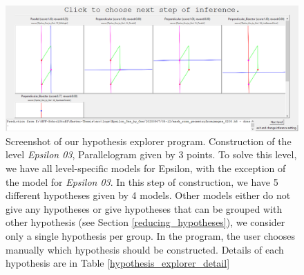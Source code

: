 \begin{figure}[h!]
\centering
\includegraphics[width=140mm]{img/hypothesis_explorer/explorer.png}
\caption{Screenshot of our hypothesis explorer program. Construction of the level \textit{Epsilon 03}, Parallelogram given by 3 points. To solve this level, we have all level-specific models for Epsilon, with the exception of the model for \textit{Epsilon 03}. In this step of construction, we have 5 different hypotheses given by 4 models. Other models either do not give any hypotheses or give hypotheses that can be grouped with other hypothesis (see Section \ref{reducing_hypotheses}), we consider only a single hypothesis per group. In the program, the user chooses manually which hypothesis should be constructed. Details of each hypothesis are in Table \ref{hypothesis_explorer_detail} }
\label{hypothesis_explorer}
\end{figure}


